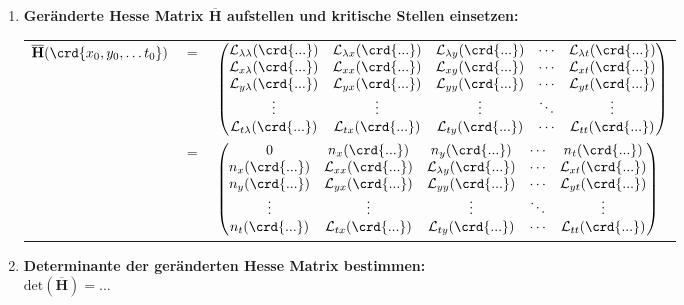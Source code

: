 \begin{enumerate}[itemsep=1ex]
    \item \textbf{Geränderte Hesse Matrix $\overline{\mathbf{H}}$ aufstellen und kritische Stellen einsetzen:}\\
    \begin{tabular}{lll}
        $\overline{\mathbf{H}}(\crd{x_0,y_0,\ldots t_0})$ &$=$&
        $\left(
            \begin{matrix}
                {{\mathcal{L}_{\lambda\lambda}(\crd{...})}}&{{\mathcal{L}_{\lambda x}(\crd{...})}}&{{\mathcal{L}_{\lambda y}(\crd{...})}}&{\cdots }&{{\mathcal{L}_{\lambda t}(\crd{...})}}\\
                {{\mathcal{L}_{x\lambda}(\crd{...})}}&{{\mathcal{L}_{xx}(\crd{...})}}&{{\mathcal{L}_{xy}(\crd{...})}}&{\cdots }&{{\mathcal{L}_{xt}(\crd{...})}}\\
                {{\mathcal{L}_{y\lambda}(\crd{...})}}&{{\mathcal{L}_{yx}(\crd{...})}}&{{\mathcal{L}_{yy}(\crd{...})}}&{\cdots }&{{\mathcal{L}_{yt}(\crd{...})}}\\
                {\vdots }&{\vdots }&{\vdots }&{\ddots }&{\vdots }\\
                {{\mathcal{L}_{t\lambda}(\crd{...})}}&{{\mathcal{L}_{tx}(\crd{...})}}&{{\mathcal{L}_{ty}(\crd{...})}}&{\cdots }&{{\mathcal{L}_{tt}(\crd{...})}}\\
            \end{matrix}
        \right)$\\
        &$=$&
        $\left(
            \begin{matrix}
                {{0}}&{{n_{x}(\crd{...})}}&{{n_{y}(\crd{...})}}&{\cdots }&{{n_{t}(\crd{...})}}\\
                {{n_{x}(\crd{...})}}&{{\mathcal{L}_{xx}(\crd{...})}}&{{\mathcal{L}_{\lambda y}(\crd{...})}}&{\cdots }&{{\mathcal{L}_{xt}(\crd{...})}}\\
                {{n_{y}(\crd{...})}}&{{\mathcal{L}_{yx}(\crd{...})}}&{{\mathcal{L}_{yy}(\crd{...})}}&{\cdots }&{{\mathcal{L}_{yt}(\crd{...})}}\\
                {\vdots }&{\vdots }&{\vdots }&{\ddots }&{\vdots }\\
                {{n_{t}(\crd{...})}}&{{\mathcal{L}_{tx}(\crd{...})}}&{{\mathcal{L}_{ty}(\crd{...})}}&{\cdots }&{{\mathcal{L}_{tt}(\crd{...})}}\\
            \end{matrix}
        \right)$
    \end{tabular}

    \item \textbf{Determinante der geränderten Hesse Matrix bestimmen:}\\
    $\text{det}\left(\overline{\mathbf{H}}\right) = ... $


\end{enumerate}
